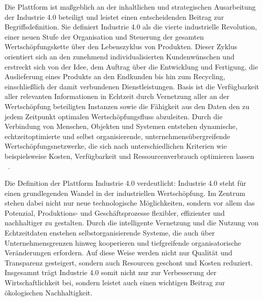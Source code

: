 Die Plattform ist maßgeblich an der inhaltlichen und strategischen Ausarbeitung der Industrie 4.0 beteiligt und leistet einen entscheidenden Beitrag zur Begriffsdefinition. 
Sie definiert Industrie 4.0 als
\glqq die vierte industrielle Revolution, einer neuen Stufe der Organisation und Steuerung der gesamten Wertschöpfungskette über den Lebenszyklus von Produkten.
Dieser Zyklus orientiert sich an den zunehmend individualisierten Kundenwünschen und erstreckt sich von der Idee, dem Auftrag über die Entwicklung und Fertigung, die Auslieferung eines Produkts an den Endkunden bis hin zum Recycling, einschließlich der damit verbundenen Dienstleistungen.
Basis ist die Verfügbarkeit aller relevanten Informationen in Echtzeit durch Vernetzung aller an der Wertschöpfung beteiligten Instanzen sowie die Fähigkeit aus den Daten den zu jedem Zeitpunkt optimalen Wertschöpfungsfluss abzuleiten. 
Durch die Verbindung von Menschen, Objekten und Systemen entstehen dynamische, echtzeitoptimierte und selbst organisierende, unternehmensübergreifende Wertschöpfungsnetzwerke, die sich nach unterschiedlichen Kriterien wie beispielsweise Kosten, Verfügbarkeit und Ressourcenverbrauch optimieren lassen \grqq~\cite[S. 8]{plattform_i40_definition}.

Die Definition der Plattform Industrie 4.0 verdeutlicht: Industrie 4.0 steht für einen grundlegenden Wandel in der industriellen Wertschöpfung.
Im Zentrum stehen dabei nicht nur neue technologische Möglichkeiten, sondern vor allem das Potenzial, Produktions- und Geschäftsprozesse flexibler, effizienter und nachhaltiger zu gestalten.
Durch die intelligente Vernetzung und die Nutzung von Echtzeitdaten enstehen selbstorganisierende Systeme, die auch über Unternehmensgrenzen hinweg kooperieren und tiefgreifende organisatorische Veränderungen erfordern.
Auf diese Weise werden nicht nur Qualität und Transparenz gesteigert, sondern auch Resourcen geschont und Kosten reduziert.
Insgesamnt trägt Industrie 4.0 somit nicht nur zur Verbesserung der Wirtschaftlichkeit bei, sondern leistet auch einen wichtigen Beitrag zur ökologischen Nachhaltigkeit.



